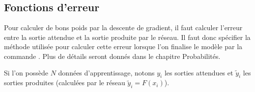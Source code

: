 \documentclass[11pt,class=report,crop=false]{standalone}
\begin{document}
\begin{minipage}{0.5\textwidth}
\end{minipage}
\begin{minipage}{0.45\textwidth}
\end{minipage}

\subsection{Fonctions d'erreur}


Pour calculer de bons poids par la descente de gradient, il faut calculer l'erreur entre la sortie attendue et la sortie produite par le réseau. Il faut donc spécifier la méthode utilisée pour calculer cette erreur lorsque l'on finalise le modèle par la commande .
Plus de détails seront donnés dans le chapitre \og{}Probabilités\fg{}.

Si l'on possède $N$ données d'apprentissage, notons $y_i$ les sorties attendues et $\widetilde y_i$ les sorties produites (calculées par le réseau $\widetilde y_i = F(x_i)$).
\end{document}
